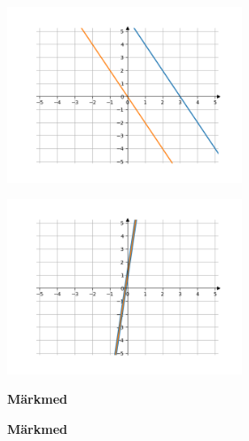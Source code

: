\begin{center}
{{{\begin{flushleft}
\begin{minipage}{7cm}
	\includegraphics[width=7cm]{25_joonis2.png}
	\label{25_joonis2}
\end{minipage}
\hspace{.05\linewidth}
\begin{minipage}{.45\linewidth}
	\includegraphics[width=7cm]{25_joonis3.png}
	\label{25_joonis3}
\end{minipage}

\end{flushleft}
}}}
\end{center}


\vspace{0.5cm}

\textbf{Märkmed}\\
\vspace{2mm}
\begin{mdframed}[style=graphpaper]
\vspace{6cm}
\end{mdframed}


\pagebreak
\vspace{0.5cm}

\textbf{Märkmed}\\
\vspace{2mm}
\begin{mdframed}[style=graphpaper]
\vspace{21cm}
\end{mdframed}